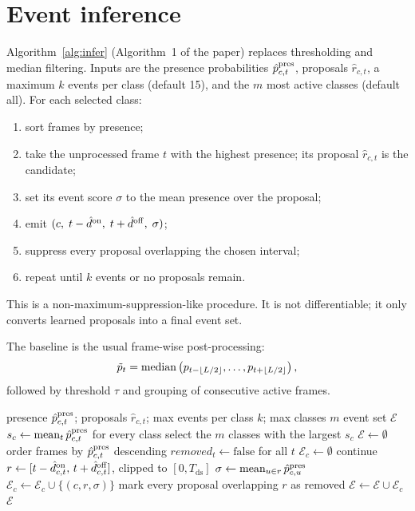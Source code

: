 \section{Event inference}

Algorithm~\ref{alg:infer} (Algorithm~1 of the paper) replaces thresholding and
median filtering. Inputs are the presence
probabilities $\hat p^{\mathrm{pres}}_{c,t}$, proposals $\hat r_{c,t}$, a maximum
$k$ events per class (default 15), and the $m$ most active classes (default all).
For each selected class:
\begin{enumerate}
\item sort frames by presence;
\item take the unprocessed frame $t$ with the highest presence; its proposal
      $\hat r_{c,t}$ is the candidate;
\item set its event score $\sigma$ to the mean presence over the proposal;
\item emit $(c,\;t-\hat d^{\mathrm{on}},\;t+\hat d^{\mathrm{off}},\;\sigma)$;
\item suppress every proposal overlapping the chosen interval;
\item repeat until $k$ events or no proposals remain.
\end{enumerate}
This is a non-maximum-suppression-like procedure. It is not differentiable; it
only converts learned proposals into a final event set.

The baseline is the usual frame-wise post-processing:
\begin{equation}
\tilde p_t
=
\operatorname{median}\left(p_{t-\lfloor L/2\rfloor},\ldots,p_{t+\lfloor L/2\rfloor}\right),
\end{equation}
followed by threshold $\tau$ and grouping of consecutive active frames.

\begin{algorithm}[t]
\caption{Event inference (Algorithm~1 of the paper)}
\label{alg:infer}
\begin{algorithmic}[1]
\Require presence $\hat p^{\mathrm{pres}}_{c,t}$; proposals $\hat r_{c,t}$;
         max events per class $k$; max classes $m$
\Ensure event set $\mathcal{E}$
\State $s_c \gets \operatorname{mean}_t \hat p^{\mathrm{pres}}_{c,t}$ for every class
\State select the $m$ classes with the largest $s_c$
\State $\mathcal{E} \gets \emptyset$
  \State order frames by $\hat p^{\mathrm{pres}}_{c,t}$ descending
  \State $removed_t \gets \mathrm{false}$ for all $t$
  \State $\mathcal{E}_c \gets \emptyset$ 
      \State continue
    \EndIf
    \State $r \gets [t-\hat d^{\mathrm{on}}_{c,t},\,t+\hat d^{\mathrm{off}}_{c,t}]$,
           clipped to $[0,T_{\mathrm{ds}}]$
    \State $\sigma \gets \operatorname{mean}_{u\in r}\hat p^{\mathrm{pres}}_{c,u}$
    \State $\mathcal{E}_c \gets \mathcal{E}_c\cup\{(c,r,\sigma)\}$
    \State mark every proposal overlapping $r$ as removed
  \EndFor
  \State $\mathcal{E} \gets \mathcal{E}\cup\mathcal{E}_c$
\EndFor
\State \Return $\mathcal{E}$
\end{algorithmic}
\end{algorithm}

